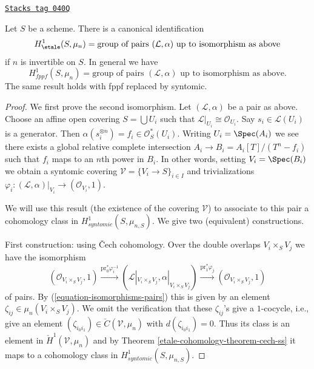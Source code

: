 \begin{lemma}
\label{etale-cohomology-lemma-describe-h1-mun}
\href{https://stacks.math.columbia.edu/tag/040Q}{\texttt{Stacks tag 040Q}}

Let $S$ be a scheme. There is a canonical identification
$$
H_\etale^1(S, \mu_n) =
\text{group of pairs }(\mathcal{L}, \alpha)\text{ up to isomorphism as above}
$$
if $n$ is invertible on $S$. In general we have
$$
H_{fppf}^1(S, \mu_n) =
\text{group of pairs }(\mathcal{L}, \alpha)\text{ up to isomorphism as above}.
$$
The same result holds with fppf replaced by syntomic.
\end{lemma}

\begin{proof}
We first prove the second isomorphism.
Let $(\mathcal{L}, \alpha)$ be a pair as above.
Choose an affine open covering $S = \bigcup U_i$ such that
$\mathcal{L}|_{U_i} \cong \mathcal{O}_{U_i}$. Say $s_i \in \mathcal{L}(U_i)$
is a generator. Then $\alpha(s_i^{\otimes n}) = f_i \in \mathcal{O}_S^*(U_i)$.
Writing $U_i = \Spec(A_i)$ we see there exists a global
relative complete intersection $A_i \to B_i = A_i[T]/(T^n - f_i)$
such that $f_i$ maps to an $n$th power in $B_i$. In other words, setting
$V_i = \Spec(B_i)$ we obtain a syntomic covering
$\mathcal{V} = \{V_i \to S\}_{i \in I}$ and trivializations
$\varphi_i : (\mathcal{L}, \alpha)|_{V_i} \to (\mathcal{O}_{V_i}, 1)$.

\medskip\noindent
We will use this result (the existence of the covering $\mathcal{V}$)
to associate to this pair a cohomology class in
$H^1_{syntomic}(S, \mu_{n, S})$. We give two (equivalent) constructions.

\medskip\noindent
First construction: using {\v C}ech cohomology.
Over the double overlaps $V_i \times_S V_j$ we have the isomorphism
$$
(\mathcal{O}_{V_i \times_S V_j}, 1)
\xrightarrow{\text{pr}_0^*\varphi_i^{-1}}
(\mathcal{L}|_{V_i \times_S V_j}, \alpha|_{V_i \times_S V_j})
\xrightarrow{\text{pr}_1^*\varphi_j}
(\mathcal{O}_{V_i \times_S V_j}, 1)
$$
of pairs. By (\ref{equation-isomorphisms-pairs}) this is given by an
element $\zeta_{ij} \in \mu_n(V_i \times_S V_j)$. We omit the verification
that these $\zeta_{ij}$'s give a $1$-cocycle, i.e., give
an element $(\zeta_{i_0i_1}) \in \check C(\mathcal{V}, \mu_n)$
with $d(\zeta_{i_0i_1}) = 0$. Thus its class is an element in
$\check H^1(\mathcal{V}, \mu_n)$ and by
Theorem \ref{etale-cohomology-theorem-cech-ss}
it maps to a cohomology class in $H^1_{syntomic}(S, \mu_{n, S})$.


\end{proof}
